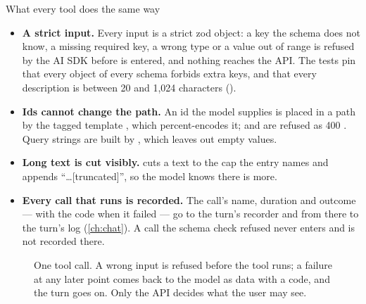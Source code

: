 \begin{codebox}{What every tool does the same way}
\begin{itemize}
  \item \textbf{A strict input.} Every input is a strict zod object: a key the schema does not
    know, a missing required key, a wrong type or a value out of range is refused by the AI SDK
    before  is entered, and nothing reaches the API. The tests pin that every object
    of every schema forbids extra keys, and that every description is between 20 and 1,024
    characters ().
  \item \textbf{Ids cannot change the path.} An id the model supplies is placed in a path by
    the tagged template , which percent-encodes it;  and  are
    refused as 400 . Query strings are built by , which leaves
    out empty values.
  \item \textbf{Long text is cut visibly.}  cuts a text to the cap the entry
    names and appends \enquote{…[truncated]}, so the model knows there is more.
  \item \textbf{Every call that runs is recorded.} The call's name, duration and outcome ---
    with the code when it failed --- go to the turn's recorder and from there to the turn's
    log (\cref{ch:chat}). A call the schema check refused never enters  and is not
    recorded there.
\end{itemize}
\end{codebox}

\begin{figure}[H]
\centering
{}
\actorlegend
\caption{One tool call. A wrong input is refused before the tool runs; a failure at any later
point comes back to the model as data with a code, and the turn goes on. Only the API decides
what the user may see.}\label{fig:tools:call}
\end{figure}

